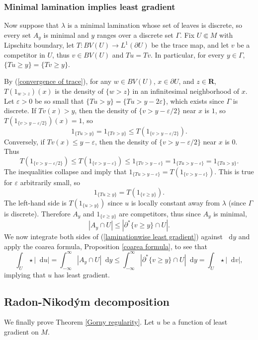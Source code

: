 \documentclass[reqno,10pt]{amsart}
\newcommand{\RR}{\mathbf{R}}
\newcommand*\dif{\mathop{}\!\mathrm{d}}
\theoremstyle{definition}
\numberwithin{equation}{section}
\begin{document}
\subsubsection{Minimal lamination implies least gradient}
Now suppose that $\lambda$ is a minimal lamination whose set of leaves is discrete, so every set $A_y$ is minimal and $y$ ranges over a discrete set $\Gamma$.
Fix $U \Subset M$ with Lipschitz boundary, let $T: BV(U) \to L^1(\partial U)$ be the trace map, and let $v$ be a competitor in $U$, thus $v \in BV(U)$ and $Tu = Tv$.
In particular, for every $y \in \Gamma$, $\{Tu \geq y\} = \{Tv \geq y\}$.

By (\ref{convergence of trace}), for any $w \in BV(U)$, $x \in \partial U$, and $z \in \RR$, $T(1_{w > z})(x)$ is the density of $\{w > z\}$ in an infinitesimal neighborhood of $x$.
Let $\varepsilon > 0$ be so small that $\{Tu > y\} = \{Tu > y - 2\varepsilon\}$, which exists since $\Gamma$ is discrete.
If $Tv(x) > y$, then the density of $\{v > y - \varepsilon/2\}$ near $x$ is $1$, so $T(1_{\{v > y - \varepsilon/2\}})(x) = 1$, so 
$$1_{\{Tu > y\}} = 1_{\{Tv > y\}} \leq T(1_{\{v > y - \varepsilon/2\}}).$$
Conversely, if $Tv(x) \leq y - \varepsilon$, then the density of $\{v > y - \varepsilon/2\}$ near $x$ is $0$. Thus 
$$T(1_{\{v > y - \varepsilon/2\}}) \leq T(1_{\{v > y - \varepsilon\}}) \leq 1_{\{Tv > y - \varepsilon\}} = 1_{\{Tu > y - \varepsilon\}} = 1_{\{Tu > y\}}.$$
The inequalities collapse and imply that $1_{\{Tu > y - \varepsilon\}} = T(1_{\{v > y - \varepsilon\}})$.
This is true for $\varepsilon$ arbitrarily small, so
$$1_{\{Tu \geq y\}} = T(1_{\{v \geq y\}}).$$
The left-hand side is $T(1_{\{u > y\}})$ since $u$ is locally constant away from $\lambda$ (since $\Gamma$ is discrete).
Therefore $A_y$ and $1_{\{v \geq y\}}$ are competitors, thus since $A_y$ is minimal, 
\begin{equation}\label{laminationwise least gradient}
|A_y \cap U| \leq |\partial^* \{v \geq y\} \cap U|.
\end{equation}
We now integrate both sides of (\ref{laminationwise least gradient}) against $\dif y$ and apply the coarea formula, Proposition \ref{coarea formula}, to see that
$$\int_U \star |\dif u| = \int_{-\infty}^\infty |A_y \cap U| \dif y \leq \int_{-\infty}^\infty |\partial^* \{v \geq y\} \cap U| \dif y = \int_U \star |\dif v|,$$
    implying that $u$ has least gradient.

\subsection{Radon-Nikod\'ym decomposition}
We finally prove Theorem \ref{Gorny regularity}.
Let $u$ be a function of least gradient on $M$.
\end{document}
